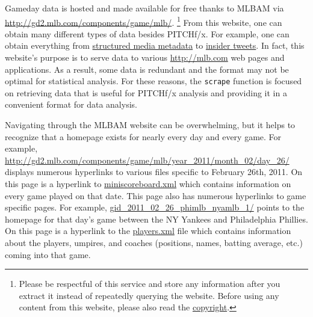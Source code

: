 \documentclass[12pt,]{isuthesis}
\let\rmarkdownfootnote\footnote%
\def\footnote{\protect\rmarkdownfootnote}
\begin{document}
Gameday data is hosted and made available for free thanks to MLBAM via
\url{http://gd2.mlb.com/components/game/mlb/}.
\footnote{Please be respectful of this service and store any information after
you extract it instead of repeatedly querying the website. Before
using any content from this website, please also read the \href{http://gdx.mlb.com/components/copyright.txt}{copyright}.
} From this website, one can obtain many different types of data besides
PITCHf/x. For example, one can obtain everything from
\href{http://gd2.mlb.com/components/game/mlb/year_2013/month_07/day_16/gid_2013_07_16_aasmlb_nasmlb_1/media/instadium.xml}{structured media metadata}
to
\href{http://gd2.mlb.com/components/game/mlb/twitter/anaInsiderTweets.xml}{insider tweets}.
In fact, this website's purpose is to serve data to various
\url{http://mlb.com} web pages and applications. As a result, some data
is redundant and the format may not be optimal for statistical analysis.
For these reasons, the \texttt{scrape} function is focused on retrieving
data that is useful for PITCHf/x analysis and providing it in a
convenient format for data analysis.

Navigating through the MLBAM website can be overwhelming, but it helps
to recognize that a homepage exists for nearly every day and every game.
For example,
\url{http://gd2.mlb.com/components/game/mlb/year_2011/month_02/day_26/}
displays numerous hyperlinks to various files specific to February 26th,
2011. On this page is a hyperlink to
\href{http://gd2.mlb.com/components/game/mlb/year_2011/month_02/day_26/miniscoreboard.xml}{miniscoreboard.xml}
which contains information on every game played on that date. This page
also has numerous hyperlinks to game specific pages. For example,
\href{http://gd2.mlb.com/components/game/mlb/year_2011/month_02/day_26/gid_2011_02_26_phimlb_nyamlb_1/}{gid\_2011\_02\_26\_phimlb\_nyamlb\_1/}
points to the homepage for that day's game between the NY Yankees and
Philadelphia Phillies. On this page is a hyperlink to the
\href{http://gd2.mlb.com/components/game/mlb/year_2011/month_02/day_26/gid_2011_02_26_phimlb_nyamlb_1/players.xml}{players.xml}
file which contains information about the players, umpires, and coaches
(positions, names, batting average, etc.) coming into that game.
\end{document}
